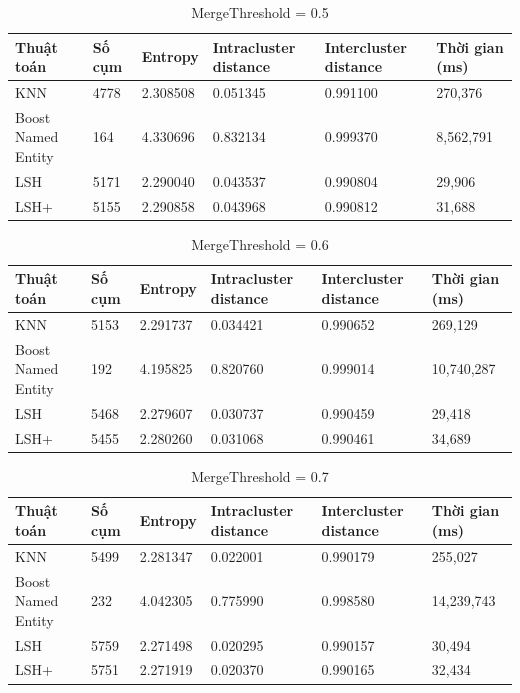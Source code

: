 		\begin{table}[H]
			\centering
			\setlength\extrarowheight{3pt}
			\begin{tabular}{|l|p{1.4cm}|p{1.5cm}|p{2cm}|p{2cm}|p{1.8cm}|}
				\hline
				Thuật toán  & Số cụm   & Entropy & Intracluster distance & Intercluster distance & Thời gian (ms) \\
				 \hline
				KNN & 4778 & 2.308508 & 0.051345 & 0.991100 & 270,376  \\
				\hline
				Boost Named Entity & 164 & 4.330696 & 0.832134 & 0.999370 & 8,562,791 \\
				\hline
				LSH & 5171 & 2.290040 & 0.043537 & 0.990804 & 29,906  \\
				\hline
				LSH+ & 5155 & 2.290858 & 0.043968 & 0.990812 & 31,688  \\
				\hline
			\end{tabular}%
			\caption{MergeThreshold = 0.5} \label{tab:table_4_5}%
		\end{table}
		
		\begin{table}[H]
			\centering
			\setlength\extrarowheight{3pt}
			\begin{tabular}{|l|p{1.4cm}|p{1.5cm}|p{2cm}|p{2cm}|p{1.8cm}|}
				\hline
				Thuật toán  & Số cụm   & Entropy & Intracluster distance & Intercluster distance & Thời gian (ms) \\
				\hline
				KNN & 5153 & 2.291737 & 0.034421 & 0.990652 & 269,129  \\
				\hline
				Boost Named Entity & 192 & 4.195825 & 0.820760 & 0.999014 & 10,740,287\\
				\hline
				LSH & 5468 & 2.279607 & 0.030737 & 0.990459 & 29,418  \\
				\hline
				LSH+ & 5455 & 2.280260 & 0.031068 & 0.990461 & 34,689  \\
				\hline
			\end{tabular}%
			\caption{MergeThreshold = 0.6} \label{tab:table_4_6}%
		\end{table}
		
		\begin{table}[H]
			\centering
			\setlength\extrarowheight{3pt}
			\begin{tabular}{|l|p{1.4cm}|p{1.5cm}|p{2cm}|p{2cm}|p{1.8cm}|}
				\hline
				Thuật toán  & Số cụm   & Entropy & Intracluster distance & Intercluster distance & Thời gian (ms) \\
			    \hline
				KNN & 5499 & 2.281347 & 0.022001 & 0.990179 & 255,027  \\
				\hline
				Boost Named Entity & 232 & 4.042305 & 0.775990 & 0.998580 & 14,239,743\\
				\hline
				LSH & 5759 & 2.271498 & 0.020295 & 0.990157 & 30,494  \\
				\hline
				LSH+ & 5751 & 2.271919 & 0.020370 & 0.990165 & 32,434  \\
				\hline
			\end{tabular}%
			\caption{MergeThreshold = 0.7} \label{tab:table_4_7}%
		\end{table}
		
